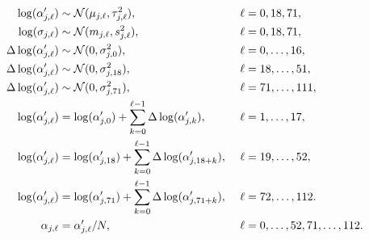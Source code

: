 \begin{small}
	\begin{align}
	\log(\alpha^\prime_{j,\ell}) &\sim \mcN(\mu_{j,\ell},\tau_{j,\ell}^2),&\ &\ell= 0,18,71, \nonumber\\
	\log(\sigma_{j,\ell}) &\sim \mcN(m_{j,\ell}, s_{j,\ell}^2),&\ &\ell=0,18,71, \nonumber\\
	\Delta\log(\alpha^\prime_{j,\ell})&\sim \mcN(0, \sigma^2_{j,0}),&\ &\ell=0,\dots,16, \nonumber\\
	\Delta\log(\alpha^\prime_{j,\ell})&\sim \mcN(0, \sigma^2_{j,18}),&\ &\ell=18,\dots,51, \nonumber\\
	\Delta\log(\alpha^\prime_{j,\ell})&\sim \mcN(0, \sigma^2_{j,71}),&\ &\ell=71,\dots,111, \nonumber\\
	\log(\alpha^\prime_{j,\ell}) &= \log(\alpha^\prime_{j,0}) + \sum_{k=0}^{\ell-1}\Delta\log(\alpha^\prime_{j,k}),&\ &\ell = 1,\dots,17, \nonumber\\
	\log(\alpha^\prime_{j,\ell}) &= \log(\alpha^\prime_{j,18}) + \sum_{k=0}^{\ell-1}\Delta\log(\alpha^\prime_{j,18+k}),&\ &\ell = 19,\dots,52, \nonumber\\
	\log(\alpha^\prime_{j,\ell}) &= \log(\alpha^\prime_{j,71}) + \sum_{k=0}^{\ell-1}\Delta\log(\alpha^\prime_{j,71+k}),&\ &\ell = 72,\dots,112. \nonumber \\
	\alpha_{j,\ell} &= \alpha^\prime_{j,\ell}/N,&\ &\ell=0,\dots,52,71,\dots,112. \nonumber
	\end{align}
\end{small}

